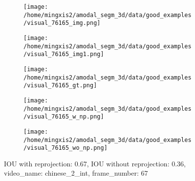 \begin{figure}
\centering
\begin{subfigure}[t]{0.19\textwidth}
\centering
\texttt{[image: /home/mingxis2/amodal\_segm\_3d/data/good\_examples/visual\_76165\_img.png]}
\end{subfigure}
\begin{subfigure}[t]{0.19\textwidth}
\centering
\texttt{[image: /home/mingxis2/amodal\_segm\_3d/data/good\_examples/visual\_76165\_img1.png]}
\end{subfigure}
\begin{subfigure}[t]{0.19\textwidth}
\centering
\texttt{[image: /home/mingxis2/amodal\_segm\_3d/data/good\_examples/visual\_76165\_gt.png]}
\end{subfigure}
\begin{subfigure}[t]{0.19\textwidth}
\centering
\texttt{[image: /home/mingxis2/amodal\_segm\_3d/data/good\_examples/visual\_76165\_w\_np.png]}
\end{subfigure}
\begin{subfigure}[t]{0.19\textwidth}
\centering
\texttt{[image: /home/mingxis2/amodal\_segm\_3d/data/good\_examples/visual\_76165\_wo\_np.png]}
\end{subfigure}
\caption{IOU with reprojection: 0.67, IOU without reprojection: 0.36, video\_name: chinese\_2\_int, frame\_number: 67}
\end{figure}


